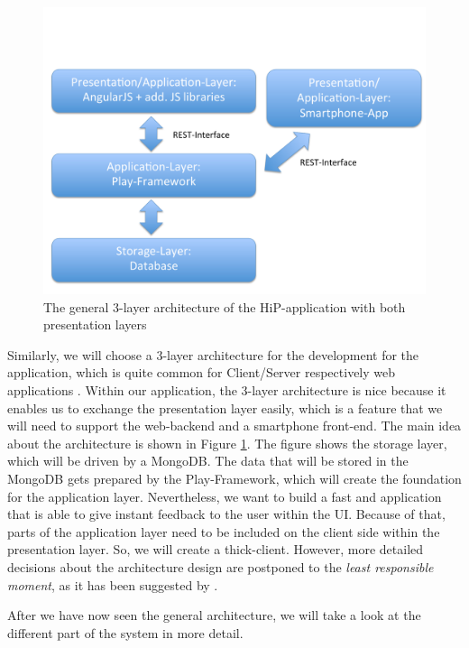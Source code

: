 \begin{figure}[th]
\centerline{\includegraphics[width=1\textwidth]{gfx/architecture}}
\caption{The general 3-layer architecture of the HiP-application with both presentation layers}
\label{hip:architecture}
\end{figure}

Similarly, we will choose a 3-layer architecture for the development for the application, which is quite common for Client/Server respectively web applications . Within our application, the 3-layer architecture is nice because it enables us to exchange the presentation layer easily, which is a feature that we will need to support the web-backend and a smartphone front-end. The main idea about the architecture is shown in Figure \ref{hip:architecture}. The figure shows the storage layer, which will be driven by a MongoDB. The data that will be stored in the MongoDB gets prepared by the Play-Framework, which will create the foundation for the application layer. Nevertheless, we want to build a fast and application that is able to give instant feedback to the user within the \ac{UI}. Because of that, parts of the application layer need to be included on the client side within the presentation layer. So, we will create a thick-client. 
 However, more detailed decisions about the architecture design are postponed to the \textit{least responsible moment}, as it has been suggested by \cite{Mast2013}.

After we have now seen the general architecture, we will take a look at the different part of the system in more detail.
 
